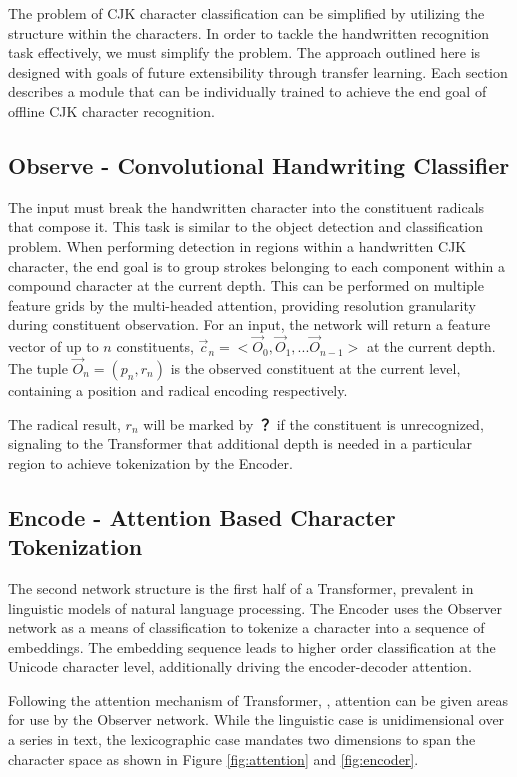 The problem of CJK character classification can be simplified by utilizing the structure within the characters. In order to tackle the handwritten recognition task effectively, we must simplify the problem. The approach outlined here is designed with goals of future extensibility through transfer learning. Each section describes a module that can be individually trained to achieve the end goal of offline CJK character recognition.

\subsection{Observe - Convolutional Handwriting Classifier}
The input must break the handwritten character into the constituent radicals that compose it. This task is similar to the object detection and classification problem. When performing detection in regions within a handwritten CJK character, the end goal is to group strokes belonging to each component within a compound character at the current depth. This can be performed on multiple feature grids by the multi-headed attention, providing resolution granularity during constituent observation. For an input, the network will return a feature vector of up to \(n\) constituents, $\vec{c}_n = <\vec{O}_0, \vec{O}_1, ... \vec{O}_{n-1}>$ at the current depth. The tuple $\vec{O}_n = (p_n,r_n)$ is the observed constituent at the current level, containing a position and radical encoding respectively.

The radical result, $r_n$ will be marked by \textbf{？} if the constituent is unrecognized, signaling to the Transformer that additional depth is needed in a particular region to achieve tokenization by the Encoder.

\subsection{Encode - Attention Based Character Tokenization}
The second network structure is the first half of a Transformer, prevalent in linguistic models of natural language processing\cite{transformers}. The Encoder uses the Observer network as a means of classification to tokenize a character into a sequence of embeddings. The embedding sequence leads to higher order classification at the Unicode character level, additionally driving the encoder-decoder attention.

Following the attention mechanism of Transformer, , attention can be given areas for use by the Observer network. While the linguistic case is unidimensional over a series in text, the lexicographic case mandates two dimensions to span the character space as shown in Figure \ref{fig:attention} and \ref{fig:encoder}.


